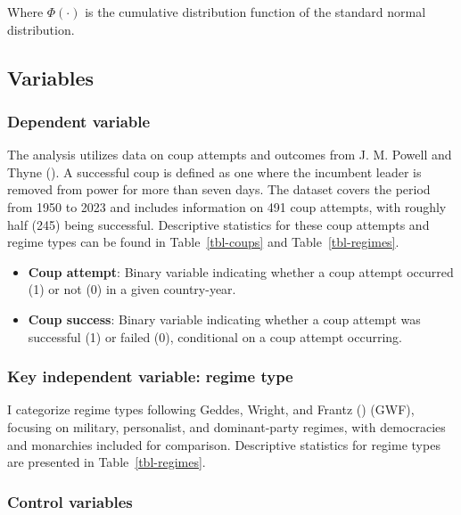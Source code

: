 \documentclass[
  12pt,
]{report}
\begin{document}
Where \(\Phi(\cdot)\) is the cumulative distribution function of the
standard normal distribution.

\subsection{Variables}\label{variables}

\subsubsection{Dependent variable}\label{dependent-variable}

The analysis utilizes data on coup attempts and outcomes from J. M.
Powell and Thyne (). A successful coup is
defined as one where the incumbent leader is removed from power for more
than seven days. The dataset covers the period from 1950 to 2023 and
includes information on 491 coup attempts, with roughly half (245) being
successful. Descriptive statistics for these coup attempts and regime
types can be found in Table~\ref{tbl-coups} and Table~\ref{tbl-regimes}.

\begin{itemize}
\item
  \textbf{Coup attempt}: Binary variable indicating whether a coup
  attempt occurred (1) or not (0) in a given country-year.
\item
  \textbf{Coup success}: Binary variable indicating whether a coup
  attempt was successful (1) or failed (0), conditional on a coup
  attempt occurring.
\end{itemize}

\subsubsection{Key independent variable: regime
type}\label{sec-chapter2322}

I categorize regime types following Geddes, Wright, and Frantz
() (GWF), focusing on military,
personalist, and dominant-party regimes, with democracies and monarchies
included for comparison. Descriptive statistics for regime types are
presented in Table~\ref{tbl-regimes}.

\subsubsection*{Control variables}\label{control-variables}
\end{document}
